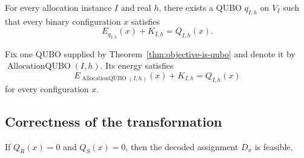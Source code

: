 \begin{theorem}
  \label{thm:objective-is-qubo}
For every allocation instance $I$ and real $h$, there exists a QUBO $q_{I,h}$
on $V_I$ such that every binary configuration $x$ satisfies
\[
  E_{q_{I,h}}(x)+K_{I,h}=Q_{I,h}(x).
\]
\end{theorem}

\begin{definition}\label{def:allocation-qubo}
Fix one QUBO supplied by Theorem~\ref{thm:objective-is-qubo} and denote it by
$\operatorname{AllocationQUBO}(I,h)$. Its energy satisfies
\[
  E_{\operatorname{AllocationQUBO}(I,h)}(x)+K_{I,h}=Q_{I,h}(x)
\]
for every configuration $x$.
\end{definition}

\subsection{Correctness of the transformation}

\begin{lemma}
  \label{lem:zero-penalty-feasible}
If $Q_R(x)=0$ and $Q_S(x)=0$, then the decoded assignment $D_x$ is feasible.
\end{lemma}


